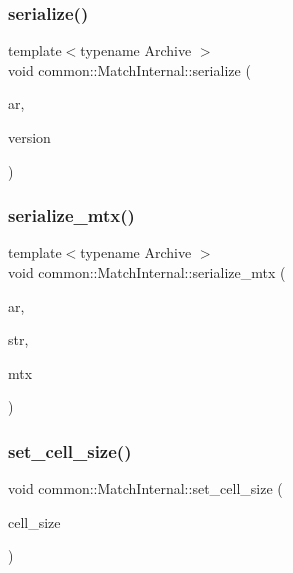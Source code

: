\subsubsection{\texorpdfstring{serialize()}{serialize()}}
{\footnotesize\ttfamily template$<$typename Archive $>$ \\
void common\+::\+Match\+Internal\+::serialize (\begin{DoxyParamCaption}\item[{Archive \&}]{ar,  }\item[{const unsigned int}]{version }\end{DoxyParamCaption})\hspace{0.3cm}{\ttfamily [inline]}}

\mbox{\label{classcommon_1_1MatchInternal_aff0df9eda9d505490b9349bcf91b5a67}} 
\subsubsection{\texorpdfstring{serialize\+\_\+mtx()}{serialize\_mtx()}}
{\footnotesize\ttfamily template$<$typename Archive $>$ \\
void common\+::\+Match\+Internal\+::serialize\+\_\+mtx (\begin{DoxyParamCaption}\item[{Archive \&}]{ar,  }\item[{std\+::string}]{str,  }\item[{Eigen\+::\+Matrix\+Xd \&}]{mtx }\end{DoxyParamCaption})\hspace{0.3cm}{\ttfamily [inline]}}

\mbox{\label{classcommon_1_1MatchInternal_ae18d8a6dfae9b7ac243e93d4b4fb3f88}} 
\subsubsection{\texorpdfstring{set\+\_\+cell\+\_\+size()}{set\_cell\_size()}}
{\footnotesize\ttfamily void common\+::\+Match\+Internal\+::set\+\_\+cell\+\_\+size (\begin{DoxyParamCaption}\item[{double}]{cell\+\_\+size }\end{DoxyParamCaption})\hspace{0.3cm}{\ttfamily [inline]}}

